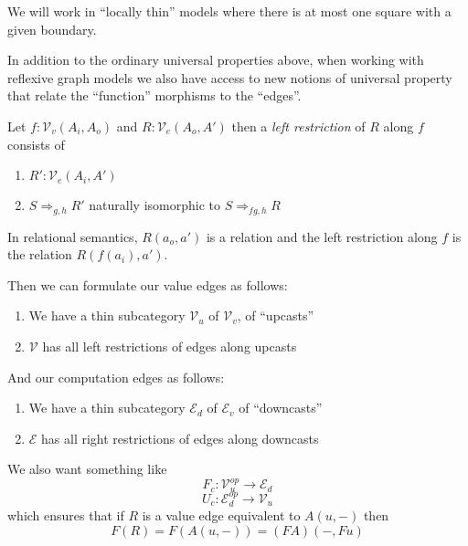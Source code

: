 We will work in ``locally thin'' models where there is at most one
square with a given boundary.

In addition to the ordinary universal properties above, when working
with reflexive graph models we also have access to new notions of
universal property that relate the ``function'' morphisms to the
``edges''.

Let $f : \mathcal V_v(A_i, A_o)$ and $R : \mathcal V_e(A_o,A')$ then a
\emph{left restriction} of $R$ along $f$ consists of
\begin{enumerate}
\item $R' : \mathcal V_e(A_i,A')$
\item $S \Rightarrow_{g,h} R'$ naturally isomorphic to $S \Rightarrow_{fg,h}R$
\end{enumerate}
In relational semantics, $R(a_o,a')$ is a relation and the left
restriction along $f$ is the relation $R(f(a_i), a')$.

Then we can formulate our value edges as follows:
\begin{enumerate}
\item We have a thin subcategory $\mathcal V_u$ of $\mathcal V_v$, of ``upcasts''
\item $\mathcal V$ has all left restrictions of edges along upcasts
\end{enumerate}

And our computation edges as follows:
\begin{enumerate}
\item We have a thin subcategory $\mathcal E_d$ of $\mathcal E_v$ of ``downcasts''
\item $\mathcal E$ has all right restrictions of edges along downcasts
\end{enumerate}

We also want something like
\[ F_c : \mathcal V_u^{op} \to \mathcal E_d \]
\[ U_c : \mathcal E_d^{op} \to \mathcal V_u \]
which ensures that if $R$ is a value edge equivalent to $A(u,-)$ then
\[ F(R) = F(A(u,-)) = (F A)(-,F u) \]

